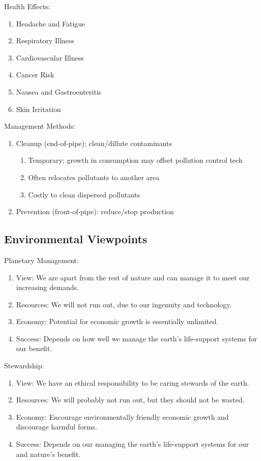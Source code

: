 \documentclass[12pt, a4paper]{article}
\begin{document}
\begin{multicols*}{3}
Health Effects:
\begin{enumerate}[\roman*.]
  \item Headache and Fatigue
  \item Respiratory Illness
  \item Cardiovascular Illness
  \item Cancer Risk
  \item Nausea and Gastroenteritis
  \item Skin Irritation
\end{enumerate}

Management Methods:
\begin{enumerate}[\roman*.]
  \item Cleanup (end-of-pipe): clean/dillute contaminants
    \begin{enumerate}[leftmargin=*, label=$-$]\vspace{1pt}
      \item Temporary; growth in consumption may offset pollution control tech
      \item Often relocates pollutants to another area 
      \item Costly to clean dispersed pollutants
    \end{enumerate}
  \item Prevention (front-of-pipe): reduce/stop production
\end{enumerate}

\colbreak
\subsection{Environmental Viewpoints}
Planetary Management:
\begin{enumerate}[\roman*.]
  \item View: We are apart from the rest of nature and can manage it to meet our increasing demands.
  \item Resources: We will not run out, due to our ingenuity and technology.
  \item Economy: Potential for economic growth is essentially unlimited.
  \item Success: Depends on how well we manage the earth's life-support systems for our benefit.
\end{enumerate}

Stewardship:
\begin{enumerate}[\roman*.]
  \item View: We have an ethical responsibility to be caring stewards of the earth.
  \item Resources: We will probably not run out, but they should not be wasted.
  \item Economy: Encourage environmentally friendly economic growth and discourage harmful forms.
  \item Success: Depends on our managing the earth's life-support systems for our and nature's benefit. 
\end{enumerate}


\end{multicols*}
\end{document}
